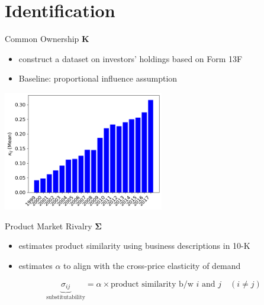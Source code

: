 \documentclass[
  aspectratio=169,  %
]{beamer}
\theoremstyle{plain}
\begin{document}
\section{Identification}

\begin{frame}{Common Ownership $\symbf{K}$}
  \begin{itemize}
    \item \citet{Backus2021-yt} construct a dataset on investors' holdings
          based on Form 13F
    \item Baseline: \cite{Rotemberg1984-jz} proportional influence assumption \hfill\hyperlink{rotemberg}{}
  \end{itemize}
  \begin{center}
    \includegraphics[width=7cm]{figures/kappa}
  \end{center}
\end{frame}
%
\begin{frame}{Product Market Rivalry $\symbf{\Sigma}$} 

  \begin{itemize}
    \item \citet{Hoberg2016-jm} estimates product similarity using business
          descriptions in 10-K
          \medskip{}
    \item \citet{Pellegrino2024-dn} estimates $\alpha$ to align with the cross-price
          elasticity of demand
  \end{itemize}
  \medskip{}
  \[
    \underbrace{\sigma_{ij}}_{\text{substitutability}}=\alpha\times\text{product similarity b/w }i\text{ and }j\quad\left(i\neq j\right)
  \]

\end{frame}
%
\end{document}

